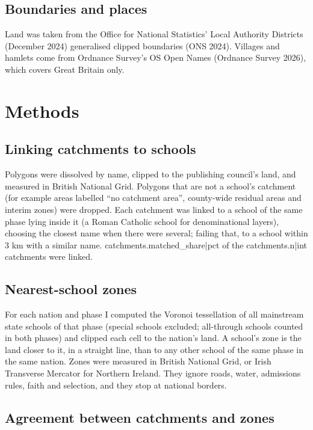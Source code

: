 \documentclass[11pt,a4paper]{article}
\begin{document}
\subsection{Boundaries and places}

Land was taken from the Office for National Statistics' Local Authority Districts (December 2024) generalised clipped boundaries (ONS 2024). Villages and hamlets come from Ordnance Survey's OS Open Names (Ordnance Survey 2026), which covers Great Britain only.

\section{Methods}

\subsection{Linking catchments to schools}

Polygons were dissolved by name, clipped to the publishing council's land, and measured in British National Grid. Polygons that are not a school's catchment (for example areas labelled ``no catchment area'', county-wide residual areas and interim zones) were dropped. Each catchment was linked to a school of the same phase lying inside it (a Roman Catholic school for denominational layers), choosing the closest name when there were several; failing that, to a school within 3 km with a similar name. {{catchments.matched_share|pct}} of the {{catchments.n|int}} catchments were linked.

\subsection{Nearest-school zones}

For each nation and phase I computed the Voronoi tessellation of all mainstream state schools of that phase (special schools excluded; all-through schools counted in both phases) and clipped each cell to the nation's land. A school's zone is the land closer to it, in a straight line, than to any other school of the same phase in the same nation. Zones were measured in British National Grid, or Irish Transverse Mercator for Northern Ireland. They ignore roads, water, admissions rules, faith and selection, and they stop at national borders.

\subsection{Agreement between catchments and zones}
\end{document}
